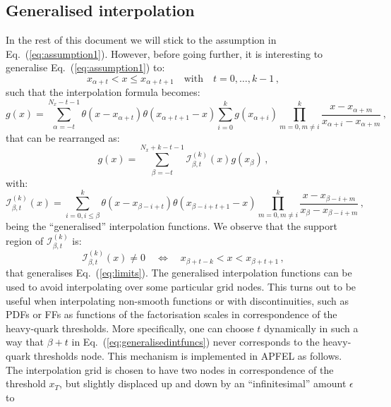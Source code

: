 \documentclass[10pt,a4paper]{article}
\begin{document}
\subsection{Generalised interpolation}

In the rest of this document we will stick to the assumption in
Eq.~(\ref{eq:assumption1}). However, before going further, it is
interesting to generalise Eq.~(\ref{eq:assumption1}) to:
\begin{equation}\label{IntAssumptionGen}
  x_{\alpha+t} < x \leq
  x_{\alpha+t+1}\quad\mbox{with}\quad t = 0,\dots,k-1\,,
\end{equation}
such that the interpolation formula becomes:
\begin{equation}\label{MoreGeneralCase}
  g(x) =
  \sum_{\alpha=-t}^{N_x-t-1}\theta(x-x_{\alpha+t})\theta(x_{\alpha+t+1}-x)\sum_{i=0}^k
  g(x_{\alpha+i})\prod^{k}_{m=0,m\ne
    i}\frac{x-x_{\alpha+m}}{x_{\alpha+i}-x_{\alpha+m}}\,,
\end{equation}
that can be rearranged as:
\begin{equation}\label{generalCase3}
g(x) =
\sum_{\beta=-t}^{N_x+k-t-1}\mathcal{I}_{\beta,t}^{(k)}(x) g(x_{\beta})\,,
\end{equation}
with:
\begin{equation}\label{eq:generalisedintfuncs}
\mathcal{I}_{\beta,t}^{(k)}(x) = \sum_{i=0,i\leq\beta}^k
\theta(x-x_{\beta-i+t})\theta(x_{\beta-i+t+1}-x) \prod^{k}_{m=0,m\ne
i}\frac{x-x_{\beta-i+m}}{x_{\beta}-x_{\beta-i+m}}\,,
\end{equation}
being the ``generalised'' interpolation functions. We observe that the
support region of $\mathcal{I}_{\beta,t}^{(k)}$ is:
\begin{equation}
\mathcal{I}_{\beta,t}^{(k)}(x)\neq 0 \quad\Leftrightarrow\quad x_{\beta+t-k} < x < x_{\beta+t+1}\,,
\end{equation}
that generalises Eq.~(\ref{eq:limits}). The generalised interpolation
functions can be used to avoid interpolating over some particular grid
nodes. This turns out to be useful when interpolating non-smooth
functions or with discontinuities, such as PDFs or FFs as functions of
the factorisation scales in correspondence of the heavy-quark
thresholds.  More specifically, one can choose $t$ dynamically in such
a way that $\beta+t$ in Eq.~(\ref{eq:generalisedintfuncs}) never
corresponds to the heavy-quark thresholds node. This mechanism is
implemented in APFEL as follows. The interpolation grid is chosen to
have two nodes in correspondence of the threshold $x_T$, but slightly
displaced up and down by an ``infinitesimal'' amount $\epsilon$ to
\end{document}
